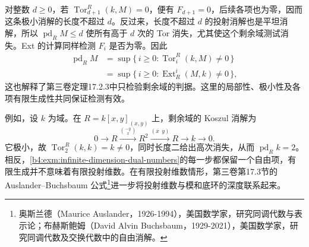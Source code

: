 \ProseParagraphBreak
对整数 \(d\ge0\)，若 \(\operatorname{Tor}_{d+1}^R(k,M)=0\)，便有 \(F_{d+1}=0\)，后续各项也为零，因而这条极小消解的长度不超过 \(d\)。反过来，长度不超过 \(d\) 的投射消解也是平坦消解，所以 \(\operatorname{pd}_RM\le d\) 使所有高于 \(d\) 次的 Tor 消失，尤其使这个剩余域测试消失。Ext 的计算同样检测 \(F_i\) 是否为零。因此
\[
	\begin{aligned}
		\operatorname{pd}_RM &=\sup\{\,i\ge0:\operatorname{Tor}_i^R(k,M)\ne0\,\}\\
		&=\sup\{\,i\ge0:\operatorname{Ext}_R^i(M,k)\ne0\,\},
	\end{aligned}
\]
这也解释了第三卷定理17.2.3中只检验剩余域的判据。这里的局部性、极小性及各项有限生成性共同保证检测有效。

\ProseParagraphBreak
例如，设 \(k\) 为域。在 \(R=k[x,y]_{(x,y)}\) 上，剩余域的 Koszul 消解为
\[
	0\longrightarrow R\xrightarrow{\binom{-y}{x}}R^2 \xrightarrow{(x\ \ y)}R\longrightarrow k\longrightarrow0.
\]
它极小，故 \(\operatorname{Tor}_2^R(k,k)=k\ne0\)，同时长度二给出高次消失，从而 \(\operatorname{pd}_Rk=2\)。相反，\cref{b4:exm:infinite-dimension-dual-numbers}的每一步都保留一个自由项，有限生成并不意味着有限投射维数。在有限投射维数情形，第三卷第17.3节的 Auslander--Buchsbaum 公式\footnote{奥斯兰德（Maurice Auslander，1926-1994），美国数学家，研究同调代数与表示论；布赫斯鲍姆（David Alvin Buchsbaum，1929-2021），美国数学家，研究同调代数及交换代数中的自由消解。}进一步将投射维数与模和底环的深度联系起来。
